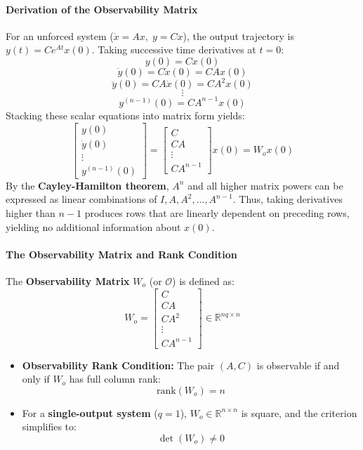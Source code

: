 \documentclass[12pt,onecolumn,twoside ]{article}
\begin{document}
	\paragraph{Derivation of the Observability Matrix}
	For an unforced system ($\dot{x} = Ax,\; y = Cx$), the output trajectory is $y(t) = C e^{At} x(0)$. Taking successive time derivatives at $t = 0$: \[
	y(0) = C x(0)
	\] \[
	\dot{y}(0) = C \dot{x}(0) = CA x(0)
	\] \[
	\ddot{y}(0) = CA \dot{x}(0) = CA^2 x(0)
	\] \[
	\vdots
	\] \[
	y^{(n-1)}(0) = CA^{n-1} x(0)
	\]
	Stacking these scalar equations into matrix form yields: \[
	\begin{bmatrix} y(0) \\ \dot{y}(0) \\ \vdots \\ y^{(n-1)}(0) \end{bmatrix} = \begin{bmatrix} C \\ CA \\ \vdots \\ CA^{n-1} \end{bmatrix} x(0) = W_o x(0)
	\]
	By the \textbf{Cayley-Hamilton theorem}, $A^n$ and all higher matrix powers can be expressed as linear combinations of ${I, A, A^2, \dots, A^{n-1}}$. Thus, taking derivatives higher than $n - 1$ produces rows that are linearly dependent on preceding rows, yielding no additional information about $x(0)$.
	\paragraph{The Observability Matrix and Rank Condition}
	The \textbf{Observability Matrix} $W_o$ (or $\mathcal{O}$) is defined as: \[
	W_o = \begin{bmatrix} C \\ CA \\ CA^2 \\ \vdots \\ CA^{n-1} \end{bmatrix} \in \mathbb{R}^{nq \times n}
	\]
	\begin{itemize}
		\item
		\textbf{Observability Rank Condition:} The pair $(A, C)$ is observable if and only if $W_o$ has full column rank: \[
		\text{rank}(W_o) = n
		\]
		\item
		For a \textbf{single-output system} ($q = 1$), $W_o \in \mathbb{R}^{n \times n}$ is square, and the criterion simplifies to: \[
		\det(W_o) \neq 0
		\]
	\end{itemize}
\end{document}
